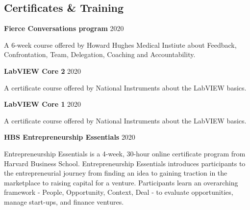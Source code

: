 \documentclass[margin,line]{res}
\begin{document}
\begin{resume}

\section{\sc Certificates \& Training}

{\bf Fierce Conversations program} \hfill {2020}\\
\vspace*{-3.5mm}
\begin{addmargin}[0pt]{.1\linewidth}
\vspace*{-1mm}
A 6-week course offered by Howard Hughes Medical Instiute about Feedback, Confrontation, Team, Delegation, Coaching and Accountability.
\end{addmargin}

\vspace*{-2mm}

{\bf LabVIEW Core 2} \hfill {2020}\\
\vspace*{-3.5mm}
\begin{addmargin}[0pt]{.1\linewidth}
\vspace*{-1mm}
A certificate course offered by National Instruments about the LabVIEW basics.
\end{addmargin}

\vspace*{-2mm}

{\bf LabVIEW Core 1} \hfill {2020}\\
\vspace*{-3.5mm}
\begin{addmargin}[0pt]{.1\linewidth}
\vspace*{-1mm}
A certificate course offered by National Instruments about the LabVIEW basics.
\end{addmargin}

\vspace*{-2mm}

{\bf HBS Entrepreneurship Essentials } \hfill {2020}\\
\vspace*{-3.5mm}
\begin{addmargin}[0pt]{.1\linewidth}
\vspace*{-1mm}
Entrepreneurship Essentials is a 4-week, 30-hour online certificate program from Harvard Business School. Entrepreneurship Essentials introduces participants to the entrepreneurial journey from finding an idea to gaining traction in the marketplace to raising capital for a venture. Participants learn an overarching framework - People, Opportunity, Context, Deal - to evaluate opportunities, manage start-ups, and finance ventures.
\end{addmargin}


\end{resume}
\end{document}
